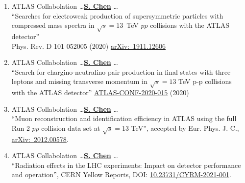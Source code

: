 \documentclass[12pt]{article}
\begin{document}
\begin{enumerate}
%
	\item ATLAS Collabolation \dots \underline{\textbf{S. Chen}} \dots \\
		   ``Searches for electroweak production of supersymmetric particles with compressed mass spectra in $\sqrt{s}=13$~TeV $pp$ collisions with the ATLAS detector'' \\
	            Phys. Rev. D 101 052005 (2020)  \href{https://arxiv.org/abs/1911.12606}{arXiv:~1911.12606}  \label{Pub::ATLPaper_EWCompressed}
%
	\item ATLAS Collabolation \dots \underline{\textbf{S. Chen}} \dots \\
          ``Search for chargino-neutralino pair production in final states with three leptons and missing transverse momentum in $\sqrt{s}=13$ TeV p-p collisions with the ATLAS detector''
           \href{https://cds.cern.ch/record/2719521}{ATLAS-CONF-2020-015} (2020)  	\label{Pub::ATLCONF_EW3L_LHCP2020}          
%
	\item ATLAS Collabolation \dots \underline{\textbf{S. Chen}} \dots \\
              ``Muon reconstruction and identification efficiency in ATLAS using the full Run 2 $pp$ collision data set at $\sqrt{s}=13$ TeV'', accepted by Eur. Phys. J. C., \href{https://arxiv.org/abs/2012.00578}{arXiv:~2012.00578}. \label{Pub::ATLPaper_muon_Run2}
%
	\item ATLAS Collabolation \dots \underline{\textbf{S. Chen}} \dots \\
              ``Radiation effects in the LHC experiments: Impact on detector performance and operation'', CERN Yellow Reports, DOI: \href{https://e-publishing.cern.ch/index.php/CYRM/issue/view/129}{10.23731/CYRM-2021-001}. \label{Pub::CERN_YR_radiation}
\end{enumerate}
\end{document}
